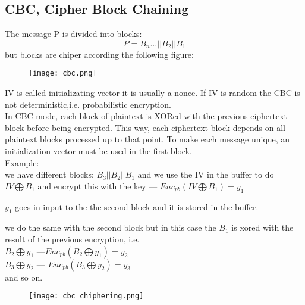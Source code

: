 \documentclass{article}
\begin{document}
\newpage
\subsection{CBC, Cipher Block Chaining}
The message P is divided into blocks:
$${P = B_n ... ||B_2||B_1}$$
but blocks are chiper according the following figure:

\begin{figure}[H]
    \centering
    \texttt{[image: cbc.png]}   
\end{figure}


\href{https://en.wikipedia.org/wiki/Initialization_vector}{IV} is called initializating vector it is usually a nonce. If IV is random the CBC is not deterministic,i.e. probabilistic encryption.\\

In CBC mode, each block of plaintext is XORed with the previous ciphertext block before being encrypted. This way, each ciphertext block depends on all plaintext blocks processed up to that point. To make each message unique, an initialization vector must be used in the first block.\\
Example:\\
we have different blocks: ${B_3||B_2||B_1}$ and we use the IV in the buffer to do ${IV \bigoplus B_1}$ and encrypt this with the key --- ${Enc_{pb}(IV \bigoplus B_1 ) = y_1}$ 

$y_1$ goes in input to the the second block and it is stored in the buffer.

we do the same with the second block but in this case the $B_1$ is xored with the result of the previous encryption, i.e.\\ $B_2 \bigoplus y_1$ ---$Enc_{pb}(B_2  \bigoplus  y_1) = y_2$\\
$B_3 \bigoplus y_2$ --- $Enc_{pb}(B_3 \bigoplus y_2 ) = y_3$\\
and so on.\\


\begin{figure}[H]
    \centering
    \texttt{[image: cbc\_chiphering.png]}
\end{figure}
\end{document}

